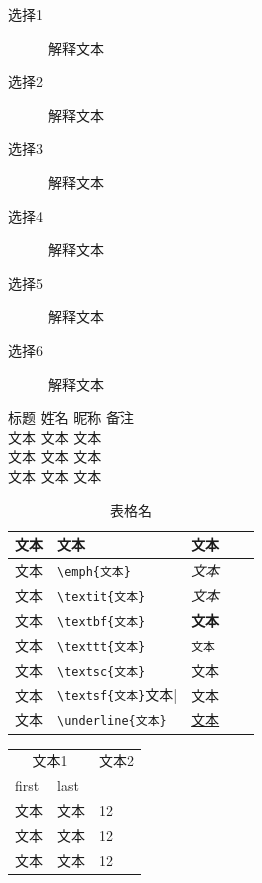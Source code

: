 \documentclass[a4paper,12pt,landscape]{book}
\begin{document}
\begin{description}
	\item [选择1]解释文本
	\item [选择2]解释文本
	\item [选择3]解释文本
	\item [选择4]解释文本
	\item [选择5]解释文本
	\item [选择6]解释文本
\end{description}

\begin{tabbing}
	标题 \= 姓名 \hspace{1.5cm}\=昵称\hspace{1.5cm} \=备注\hspace{1.5cm}\\
	\> 文本 \>  文本 \> 文本\\
	\> 文本 \>  文本 \> 文本\\
	\> 文本 \>  文本 \> 文本\\
\end{tabbing}

\begin{table}
\begin{tabular}{lllll}
	\textbf{文本}&\textbf{文本}&\textbf{文本}\\
	\hline
	文本 & \verb|\emph{文本}| & \emph{文本} \\
	文本 & \verb|\textit{文本}| & \textit{文本} \\
	文本 & \verb|\textbf{文本}| & \textbf{文本} \\
	文本 & \verb|\texttt{文本}| & \texttt{文本} \\
	文本 & \verb|\textsc{文本}| & \textsc{文本} \\
	文本 & \verb|\textsf{文本}|{文本}|& \textsf{文本} \\
	文本 & \verb*|\underline{文本}| & \underline{文本} \\	
\end{tabular}
\caption{表格名}\label{sec:typeemp1}
\end{table}

\begin{tabular}{@{}*3l@{}}
	
	\multicolumn{2}{c}{文本1}&
	
	\multicolumn{1}{c}{文本2} \\
	first & last \\
	\hline
	文本 & 文本 & 12 \\
	文本 & 文本 & 12 \\
	文本 & 文本 & 12 \\
\end{tabular}
\end{document}
